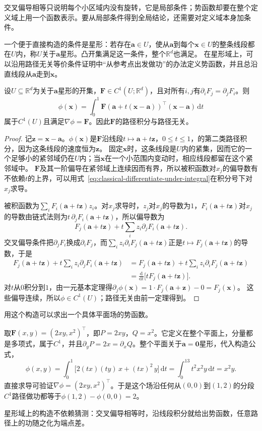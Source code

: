 交叉偏导相等只说明每个小区域内没有旋转，它是局部条件；势函数却要在整个定义域上用一个函数表示。要从局部条件得到全局结论，还需要对定义域本身加条件。

一个便于直接构造的条件是星形：若存在$\bm a\in U$，使从$\bm a$到每个$\bm x\in U$的整条线段都在$U$内，称$U$关于$\bm a$星形。凸开集满足这一条件，整个$\mathbb R^d$也满足。
在星形域上，可以沿用路径无关等价条件证明中“从参考点出发做功”的办法定义势函数，并且总沿直线段从$\bm a$走到$\bm x$。
\begin{theorem}[星形域上势函数的构造]
设$U\subseteq\mathbb R^d$为关于$\bm a$星形的开集，$\bm F\in C^1(U;\mathbb R^d)$，且对所有$i,j$有$\partial_iF_j=\partial_jF_i$。则
\[
 \phi(\bm x)=\int_0^1\bm F(\bm a+t(\bm x-\bm a))^\top(\bm x-\bm a)\,\mathrm dt
\]
属于$C^1(U)$且满足$\nabla\phi=\bm F$。因此$\bm F$的路径积分与路径无关。
\end{theorem}
\begin{proof}
记$\bm z=\bm x-\bm a$。$\phi(\bm x)$是$\bm F$沿线段$t\mapsto\bm a+t\bm z$，$0\leq t\leq1$，的第二类路径积分，因为这条线段的速度恒为$\bm z$。
固定$\bm x$时，这条线段是$U$内的紧集，因而它的一个足够小的紧邻域仍在$U$内；当$\bm x$在一个小范围内变动时，相应线段都留在这个紧邻域中。
$\bm F$及其一阶偏导在紧邻域上连续因而有界，所以被积函数对$x_j$的偏导数有不依赖$t$的上界，可以用式~\eqref{eq:classical-differentiate-under-integral}在积分号下对$x_j$求导。

被积函数为$\sum_iF_i(\bm a+t\bm z)z_i$。对$x_j$求导时，$z_j$对$x_j$的导数为$1$，$F_i(\bm a+t\bm z)$对$x_j$的导数由链式法则为$t\,\partial_jF_i(\bm a+t\bm z)$，所以偏导数为
\[
 F_j(\bm a+t\bm z)+t\sum_i z_i\partial_jF_i(\bm a+t\bm z).
\]
交叉偏导条件把$\partial_jF_i$换成$\partial_iF_j$，而$\sum_iz_i\partial_iF_j(\bm a+t\bm z)$正是$t\mapsto F_j(\bm a+t\bm z)$的导数，于是
\[
 \begin{aligned}
 F_j(\bm a+t\bm z)+t\sum_i z_i\partial_jF_i(\bm a+t\bm z)
 &=F_j(\bm a+t\bm z)+t\sum_i z_i\partial_iF_j(\bm a+t\bm z)\\
 &=\frac{\mathrm d}{\mathrm dt}\bigl[tF_j(\bm a+t\bm z)\bigr].
 \end{aligned}
\]
对$t$从$0$积分到$1$，由一元基本定理得$\partial_j\phi(\bm x)=1\cdot F_j(\bm a+\bm z)-0=F_j(\bm x)$。
这些偏导连续，所以$\phi\in C^1(U)$；路径无关由前一定理得到。
\end{proof}

用这个构造可以求出一个具体平面场的势函数。
\begin{example}[沿线段构造势函数$x^2y$]
取$\bm F(x,y)=(2xy,x^2)^\top$，即$P=2xy$，$Q=x^2$。它定义在整个平面上，分量都是多项式，属于$C^1$，并且$\partial_yP=2x=\partial_xQ$。整个平面关于$\bm a=\bm0$星形，代入构造公式，
\[
 \phi(x,y)=\int_0^1\bigl[2(tx)(ty)\,x+(tx)^2\,y\bigr]\,\mathrm dt
 =\int_0^13t^2x^2y\,\mathrm dt=x^2y.
\]
直接求导可验证$\nabla\phi=(2xy,x^2)^\top$。于是这个场沿任何从$(0,0)$到$(1,2)$的分段$C^1$路径做功都等于$\phi(1,2)-\phi(0,0)=2$。
\end{example}
星形域上的构造不依赖猜测：交叉偏导相等时，沿线段积分就给出势函数，任意路径上的功随之化为端点差。

